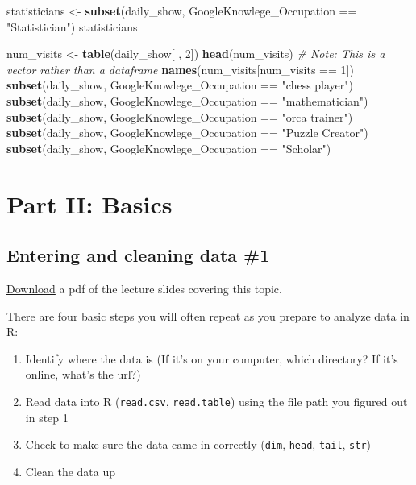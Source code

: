 \documentclass[]{book}
\makeatletter
\newenvironment{Shaded}{\begin{snugshade}}{\end{snugshade}}
\newcommand{\KeywordTok}[1]{\textcolor[rgb]{0.13,0.29,0.53}{\textbf{{#1}}}}
\newcommand{\DecValTok}[1]{\textcolor[rgb]{0.00,0.00,0.81}{{#1}}}
\newcommand{\StringTok}[1]{\textcolor[rgb]{0.31,0.60,0.02}{{#1}}}
\newcommand{\CommentTok}[1]{\textcolor[rgb]{0.56,0.35,0.01}{\textit{{#1}}}}
\newcommand{\NormalTok}[1]{{#1}}
\providecommand{\tightlist}{%
  \setlength{\itemsep}{0pt}\setlength{\parskip}{0pt}}
\newenvironment{kframe}{%
\medskip{}
\setlength{\fboxsep}{.8em}
 \def\at@end@of@kframe{}%
 \ifinner\ifhmode%
  \def\at@end@of@kframe{\end{minipage}}%
  \begin{minipage}{\columnwidth}%
 \fi\fi%
 \def\FrameCommand##1{\hskip\@totalleftmargin \hskip-\fboxsep
 \colorbox{shadecolor}{##1}\hskip-\fboxsep
     \hskip-\linewidth \hskip-\@totalleftmargin \hskip\columnwidth}%
 \MakeFramed {\advance\hsize-\width
   \@totalleftmargin\z@ \linewidth\hsize
   \@setminipage}}%
 {\par\unskip\endMakeFramed%
 \at@end@of@kframe}
\renewenvironment{Shaded}{\begin{kframe}}{\end{kframe}}
\makeatother
\begin{document}
\begin{Shaded}
\begin{Highlighting}[]
\NormalTok{statisticians <-}\StringTok{ }\KeywordTok{subset}\NormalTok{(daily_show,}
                        \NormalTok{GoogleKnowlege_Occupation ==}\StringTok{ "Statistician"}\NormalTok{)}
\NormalTok{statisticians}
\end{Highlighting}
\end{Shaded}

\begin{Shaded}
\begin{Highlighting}[]
\NormalTok{num_visits <-}\StringTok{ }\KeywordTok{table}\NormalTok{(daily_show[ , }\DecValTok{2}\NormalTok{])}
\KeywordTok{head}\NormalTok{(num_visits) }\CommentTok{# Note: This is a vector rather than a dataframe}
\KeywordTok{names}\NormalTok{(num_visits[num_visits ==}\StringTok{ }\DecValTok{1}\NormalTok{])}
\KeywordTok{subset}\NormalTok{(daily_show, GoogleKnowlege_Occupation ==}\StringTok{ "chess player"}\NormalTok{)}
\KeywordTok{subset}\NormalTok{(daily_show, GoogleKnowlege_Occupation ==}\StringTok{ "mathematician"}\NormalTok{)}
\KeywordTok{subset}\NormalTok{(daily_show, GoogleKnowlege_Occupation ==}\StringTok{ "orca trainer"}\NormalTok{)}
\KeywordTok{subset}\NormalTok{(daily_show, GoogleKnowlege_Occupation ==}\StringTok{ "Puzzle Creator"}\NormalTok{)}
\KeywordTok{subset}\NormalTok{(daily_show, GoogleKnowlege_Occupation ==}\StringTok{ "Scholar"}\NormalTok{)}
\end{Highlighting}
\end{Shaded}

\part{Part II: Basics}\label{part-part-ii-basics}


\chapter{Entering and cleaning data
\#1}\label{entering-and-cleaning-data-1}

\href{https://github.com/geanders/RProgrammingForResearch/raw/master/slides/CourseNotes_Week2.pdf}{Download}
a pdf of the lecture slides covering this topic.

There are four basic steps you will often repeat as you prepare to
analyze data in R:

\begin{enumerate}
\def\labelenumi{\arabic{enumi}.}
\tightlist
\item
  Identify where the data is (If it's on your computer, which directory?
  If it's online, what's the url?)
\item
  Read data into R (\texttt{read.csv}, \texttt{read.table}) using the
  file path you figured out in step 1
\item
  Check to make sure the data came in correctly (\texttt{dim},
  \texttt{head}, \texttt{tail}, \texttt{str})
\item
  Clean the data up
\end{enumerate}
\end{document}

